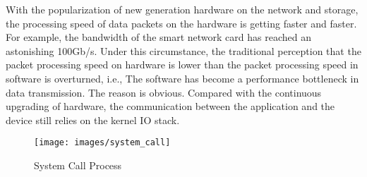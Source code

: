 










With the popularization of new generation hardware on the network and storage, the processing speed 
of data packets on the hardware is getting faster and faster\cite{12}. For example, the bandwidth of the smart
network card has reached an astonishing 100Gb/s. Under this circumstance, the traditional perception
 that the packet processing speed on hardware is lower than the packet processing speed in software is overturned\cite{Ousterhout1990WhyAO}, i.e.,
The software has become a performance bottleneck in data transmission.
The reason is obvious. Compared with the continuous upgrading of hardware, 
the communication between the application and the device still relies on the kernel IO stack. 

\begin{figure}[H]
  \centering
  \texttt{[image: images/system\_call]}
  \caption[Short description]{System Call Process}
  \label{fig:system_call_process}
\end{figure}
 
